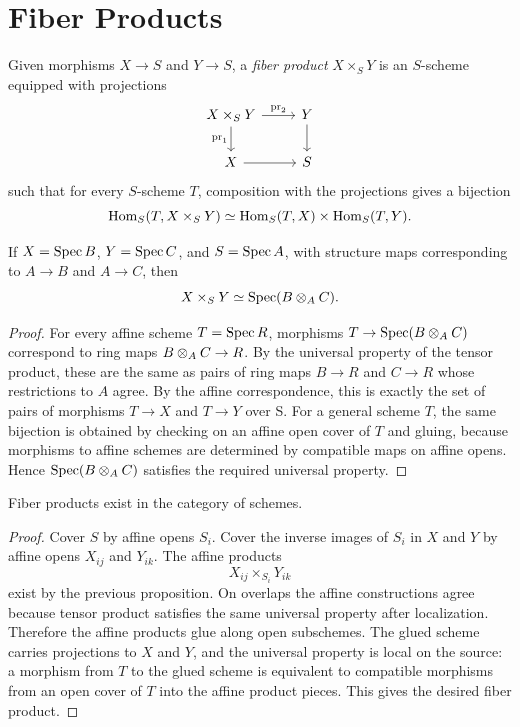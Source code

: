 \section{Fiber Products}

\begin{definition}
Given morphisms \(X\to S\) and \(Y\to S\), a \emph{fiber product}
\(X\times_S Y\) is an \(S\)-scheme equipped with projections
\[
\begin{tikzcd}
X\times_S Y \arrow[r,"\pr_2"] \arrow[d,"\pr_1"'] & Y \arrow[d]\\
X \arrow[r] & S
\end{tikzcd}
\]
such that for every \(S\)-scheme \(T\), composition with the projections gives
a bijection
\[
    \operatorname{Hom}_S(T,X\times_S Y)
    \simeq
    \operatorname{Hom}_S(T,X)\times \operatorname{Hom}_S(T,Y).
\]
\end{definition}

\begin{proposition}
If \(X=\operatorname{Spec} B\), \(Y=\operatorname{Spec} C\), and \(S=\operatorname{Spec} A\), with structure maps
corresponding to \(A\to B\) and \(A\to C\), then
\[
    X\times_S Y \simeq \operatorname{Spec}(B\otimes_A C).
\]
\end{proposition}

\begin{proof}
For every affine scheme \(T=\operatorname{Spec} R\), morphisms \(T\to \operatorname{Spec}(B\otimes_A C)\)
correspond to ring maps \(B\otimes_A C\to R\).  By the universal property of the
tensor product, these are the same as pairs of ring maps \(B\to R\) and
\(C\to R\) whose restrictions to \(A\) agree.  By the affine correspondence,
this is exactly the set of pairs of morphisms \(T\to X\) and \(T\to Y\) over
S.  For a general scheme \(T\), the same bijection is obtained by checking on
an affine open cover of \(T\) and gluing, because morphisms to affine schemes
are determined by compatible maps on affine opens.  Hence
\(\operatorname{Spec}(B\otimes_A C)\) satisfies the required universal property.
\end{proof}

\begin{theorem}
Fiber products exist in the category of schemes.
\end{theorem}

\begin{proof}
Cover \(S\) by affine opens \(S_i\).  Cover the inverse images of \(S_i\) in
\(X\) and \(Y\) by affine opens \(X_{ij}\) and \(Y_{ik}\).  The affine products
\[
    X_{ij}\times_{S_i}Y_{ik}
\]
exist by the previous proposition.  On overlaps the affine constructions agree
because tensor product satisfies the same universal property after
localization.  Therefore the affine products glue along open subschemes.  The
glued scheme carries projections to \(X\) and \(Y\), and the universal property
is local on the source: a morphism from \(T\) to the glued scheme is equivalent
to compatible morphisms from an open cover of \(T\) into the affine product
pieces.  This gives the desired fiber product.
\end{proof}

